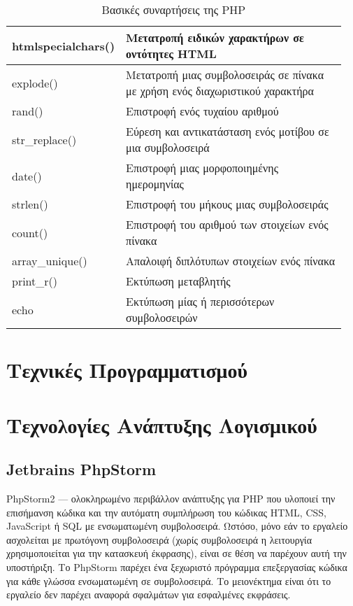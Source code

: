 \begin{table}[h]
	\caption{Βασικές συναρτήσεις της PHP}
	\label{tbl:php_basic_functions}
	\begin{tabular}{|p{0.2\linewidth}|p{0.75\linewidth}|}
		\hline
		htmlspecialchars() & Μετατροπή ειδικών χαρακτήρων σε οντότητες HTML \\ \hline
		explode() & Μετατροπή μιας συμβολοσειράς σε πίνακα με χρήση ενός διαχωριστικού χαρακτήρα \\ \hline
		rand() & Επιστροφή ενός τυχαίου αριθμού \\ \hline
		str\_replace() & Εύρεση και αντικατάσταση ενός μοτίβου σε μια συμβολοσειρά \\ \hline
		date() & Επιστροφή μιας μορφοποιημένης ημερομηνίας \\ \hline
		strlen() & Επιστροφή του μήκους μιας συμβολοσειράς \\ \hline
		count() & Επιστροφή του αριθμού των στοιχείων ενός πίνακα \\ \hline
		array\_unique() & Απαλοιφή διπλότυπων στοιχείων ενός πίνακα \\ \hline
		print\_r() & Εκτύπωση μεταβλητής \\ \hline
		echo & Εκτύπωση μίας ή περισσότερων συμβολοσειρών \\ \hline
	\end{tabular}
\end{table}

\section{Τεχνικές Προγραμματισμού}

\section{Τεχνολογίες Ανάπτυξης Λογισμικού}

\subsection{Jetbrains PhpStorm}
PhpStorm2 — ολοκληρωμένο περιβάλλον ανάπτυξης για PHP που υλοποιεί την επισήμανση κώδικα και την αυτόματη συμπλήρωση του κώδικας HTML, CSS, JavaScript ή SQL με ενσωματωμένη συμβολοσειρά. Ωστόσο, μόνο εάν το εργαλείο ασχολείται με πρωτόγονη συμβολοσειρά (χωρίς συμβολοσειρά η λειτουργία χρησιμοποιείται για την κατασκευή έκφρασης), είναι σε θέση να παρέχουν αυτή την υποστήριξη. Το PhpStorm παρέχει ένα ξεχωριστό πρόγραμμα επεξεργασίας κώδικα για κάθε γλώσσα ενσωματωμένη σε συμβολοσειρά. Το μειονέκτημα είναι ότι το εργαλείο δεν παρέχει αναφορά σφαλμάτων για εσφαλμένες εκφράσεις. \cite{grigorev2014string}

